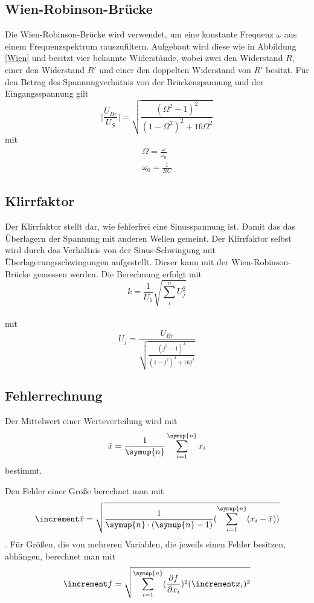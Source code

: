     \subsection{Wien-Robinson-Brücke}
    Die Wien-Robinson-Brücke wird verwendet, um eine konstante Frequenz $\omega$ aus einem Frequenzspektrum rauszufiltern.
    Aufgebaut wird diese wie in Abbildung \ref{Wien} und besitzt vier bekannte Widerstände, wobei zwei den Widerstand $R$, einer den Widerstand $R'$ und einer den doppelten Widerstand von $R'$ besitzt.
    Für den Betrag des Spannungverhätnis von der Brückenspannung und der Eingangsspannung gilt 
    \begin{equation}
       \biggl|\frac{U_{Br}}{U_S}\biggr|=\sqrt{\frac{(\Omega^2-1)^2}{(1-\Omega^2)^2+16\Omega^2}}
    \end{equation}
    mit 
    \begin{gather}
        \Omega=\frac{\omega}{\omega_0}\\
        \omega_0=\frac{1}{RC}
    \end{gather}

    \subsection{Klirrfaktor}
    Der Klirrfaktor stellt dar, wie fehlerfrei eine Sinusspannung ist. 
    Damit das das Überlagern der Spannung mit anderen Wellen gemeint.
    Der Klirrfaktor selbst wird durch das Verhältnis von der Sinus-Schwingung mit Überlagerungsschwingungen aufgestellt.
    Dieser kann mit der Wien-Robinson-Brücke gemessen werden.       
    Die Berechnung erfolgt mit 
    \begin{equation}
        k=\frac{1}{U_1}\sqrt{\sum_{i}^{n}{U_j^2}}
    \end{equation}\\
    mit
    \begin{equation}
        U_j=\frac{U_{Br}}{\sqrt{\frac{(j^2-1)^2}{(1-j^2)^2+16j^2}}} 
    \end{equation}

\subsection{Fehlerrechnung}
Der Mittelwert einer Werteverteilung wird mit
\begin{equation}
    \bar{x}=\frac{1}{\symup{n}}\sum_{i=1}^{\symup{n}} x_i
    \label{eqn:MW}
\end{equation} 
bestimmt.

Den Fehler einer Größe berechnet man mit
\begin{equation}
    \increment\bar{x}=\sqrt{\frac{1}{\symup{n}\cdot(\symup{n}-1)}(\sum_{i=1}^{\symup{n}} (x_i - \bar{x}))}
\end{equation}.
Für Größen, die von mehreren Variablen, die jeweils einen Fehler besitzen, abhängen, berechnet man mit
\begin{equation}
    \increment f=\sqrt{\sum_{i=1}^{\symup{n}} (\frac{\partial f}{\partial x_i})^2 (\increment x_i)^2}
\end{equation}
